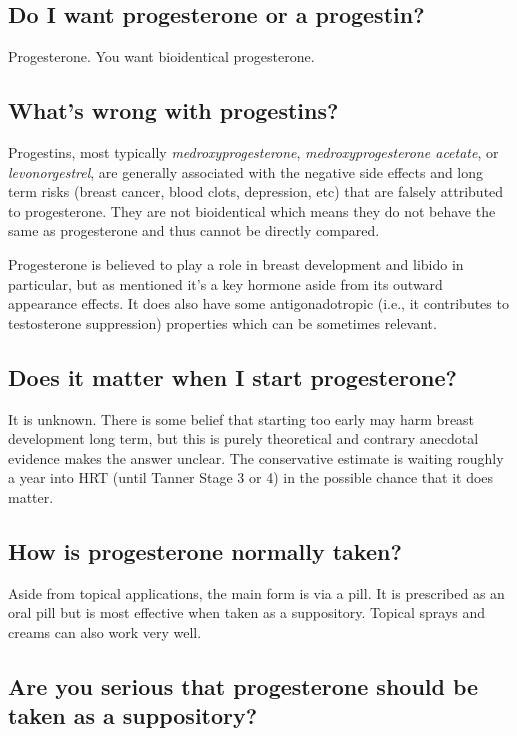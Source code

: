 \documentclass{article}
\begin{document}
\subsection{Do I want progesterone or a progestin?}

Progesterone. You want bioidentical progesterone.

\subsection{What’s wrong with progestins?}

Progestins, most typically \textit{medroxyprogesterone}, \textit{medroxyprogesterone acetate}, or \textit{levonorgestrel}, are generally associated with the negative side effects and long term risks (breast cancer, blood clots, depression, etc) that are falsely attributed to progesterone. They are not bioidentical which means they do not behave the same as progesterone and thus cannot be directly compared.


Progesterone is believed to play a role in breast development and libido in particular, but as mentioned it’s a key hormone aside from its outward appearance effects. It does also have some antigonadotropic (i.e., it contributes to testosterone suppression) properties which can be sometimes relevant.

\subsection{Does it matter when I start progesterone?}

It is unknown. There is some belief that starting too early may harm breast development long term, but this is purely theoretical and contrary anecdotal evidence makes the answer unclear. The conservative estimate is waiting roughly a year into HRT (until Tanner Stage 3 or 4) in the possible chance that it does matter.

\subsection{How is progesterone normally taken?}

Aside from topical applications, the main form is via a pill. It is prescribed as an oral pill but is most effective when taken as a suppository. Topical sprays and creams can also work very well.

\subsection{Are you serious that progesterone should be taken as a suppository?}
\end{document}
